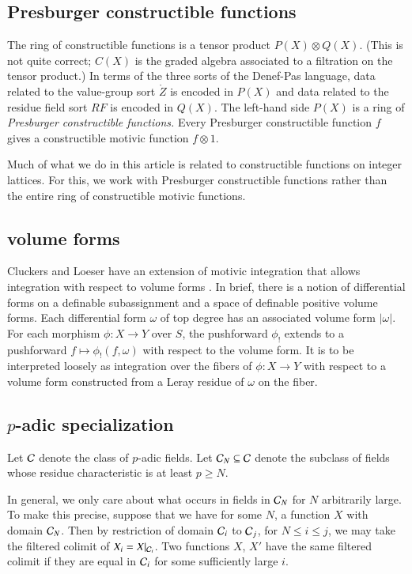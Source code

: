\subsection{Presburger constructible functions}

The ring of constructible functions is a tensor product $P(X) \otimes Q(X)$.  (This is not quite correct; $C(X)$ is the graded
algebra associated to a filtration on the tensor product.)  In terms of the three sorts of the Denef-Pas language,
data related to the value-group sort $\ring{Z}$ is encoded in $P(X)$ and data related to the residue field sort $RF$ is encoded
in $Q(X)$.  The left-hand side $P(X)$ is a ring of {\it Presburger
constructible functions.}  Every Presburger constructible function $f$ gives a constructible motivic function $f\otimes 1$.

Much of what we do in this article is related to constructible functions on integer lattices.  For this, we work with Presburger
constructible functions rather than the entire ring of constructible motivic functions.

\subsection{volume forms}

Cluckers and Loeser have an extension of motivic integration that allows integration with respect to volume
forms \cite[\S8]{cluckers2008constructible}.  In brief, there is a notion of differential forms on a definable subassignment
and a space of definable positive volume forms.  Each differential form $\omega$ of top degree has an associated volume
form $|\omega|$.   For each morphism $\phi:X\to Y$ over $S$, the pushforward $\phi_!$ extends to a pushforward
$f \mapsto \phi_!(f,\omega)$ with respect to the volume form.   It is to be interpreted loosely as integration over
the fibers of $\phi:X\to Y$ with respect to a volume form constructed from a Leray residue of $\omega$ on the fiber.

\subsection{$p$-adic specialization}

Let $\mathcal C$ denote the class of $p$-adic fields.
Let $\mathcal C_N\subseteq \mathcal C$ denote the subclass of fields whose residue characteristic is at least $p\ge N$.

In general, we only care about what occurs in fields in $\mathcal C_N$ for $N$ arbitrarily large.
To make this precise, suppose that we have for some $N$, a function $X$ with domain $\mathcal C_N$.
Then by restriction of domain $\mathcal C_i$ to $\mathcal C_{j}$, for $N\le i\le j$, we may take the filtered colimit of $X_i=X|_{\mathcal C_i}$.
Two functions $X$, $X'$ have the same filtered colimit if they are equal in $\mathcal C_i$ for some sufficiently large $i$.

